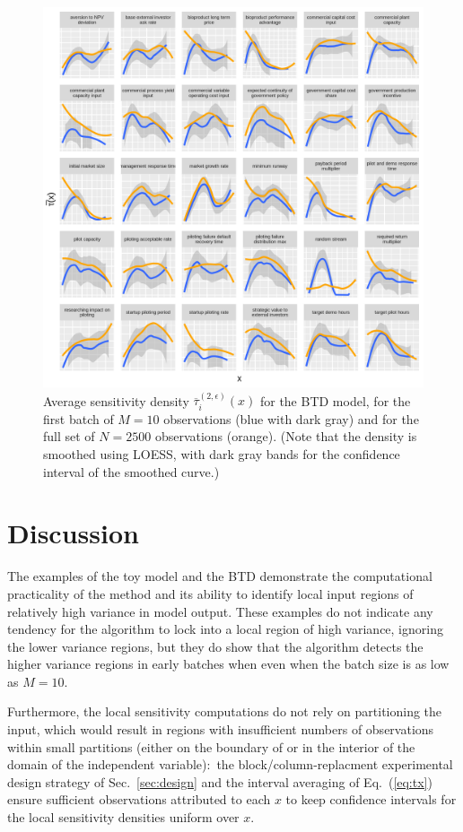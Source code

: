 \documentclass[12pt]{article}
\begin{document}
\begin{figure}
    \centering
    \includegraphics[width=\linewidth]{figures/btd-taubar1.png}
    \caption{Average sensitivity density $\overline{\tau}_i^{(2,\epsilon)}(x)$ for the BTD model, for the first batch of $M = 10$ observations (blue with dark gray) and for the full set of $N = 2500$ observations (orange). (Note that the density is smoothed using LOESS, with dark gray bands for the confidence interval of the smoothed curve.)}
    \label{fig:btd-taubar1}
\end{figure}


\section{Discussion}
\label{sec:discuss}

The examples of the toy model and the BTD demonstrate the computational practicality of the method and its ability to identify local input regions of relatively high variance in model output. These examples do not indicate any tendency for the algorithm to lock into a local region of high variance, ignoring the lower variance regions, but they do show that the algorithm detects the higher variance regions in early batches when even when the batch size is as low as $M = 10$.

Furthermore, the local sensitivity computations do not rely on partitioning the input, which would result in regions with insufficient numbers of observations within small partitions (either on the boundary of or in the interior of the domain of the independent variable):\ the block/column-replacment experimental design strategy of Sec.~\ref{sec:design} and the interval averaging of Eq.~(\ref{eq:tx}) ensure sufficient observations attributed to each $x$ to keep confidence intervals for the local sensitivity densities uniform over $x$.
\end{document}
